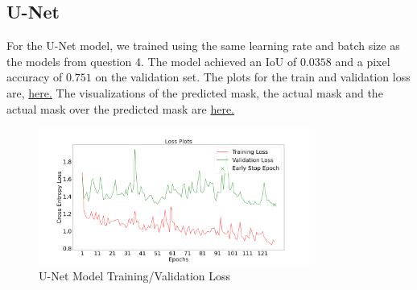 \documentclass{article}
\begin{document}
\subsection{U-Net}
For the U-Net model, we trained using the same learning rate and batch size as the models from question 4. The model achieved an IoU of $0.0358$ and a pixel accuracy of $0.751$ on the validation set. The plots for the train and validation loss are, \hyperref[fig:unet_train_loss]{here.} The visualizations of the predicted mask, the actual mask and the actual mask over the predicted mask are \hyperref[fig:unet_masks_visualization]{here.}

\begin{figure}[h!]
  \centering
  \includegraphics[width=0.8\textwidth]{include/plots/train_5_c_loss.png}
  \caption{U-Net Model Training/Validation Loss}
  \label{fig:unet_train_loss}
\end{figure}
\end{document}
